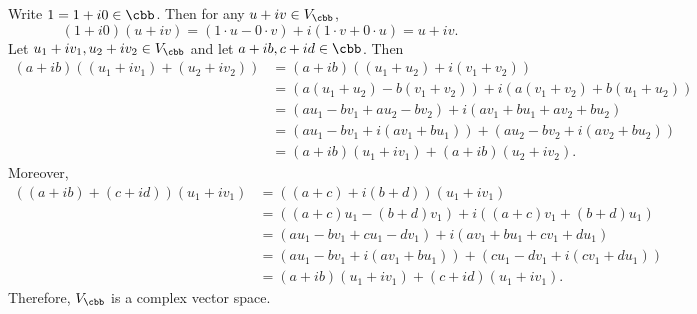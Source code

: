 \begin{sol}
     Write $1 = 1 + i0 \in \cbb$.
    Then for any $u + iv \in V_{\cbb}$,
    \[
        (1 + i0)(u + iv) = (1 \cdot u - 0 \cdot v) + i(1 \cdot v + 0 \cdot u) = u + iv.
    \]
     Let $u_1 + iv_1, u_2 + iv_2 \in V_{\cbb}$ and let $a + ib, c + id \in \cbb$.
    Then
    \begin{align*}
        (a + ib)((u_1 + iv_1) + (u_2 + iv_2)) &= (a + ib)((u_1 + u_2) + i(v_1 + v_2)) \\
        &= (a(u_1 + u_2) - b(v_1 + v_2)) + i(a(v_1 + v_2) + b(u_1 + u_2)) \\
        &= (au_1 - bv_1 + au_2 - bv_2) + i(av_1 + bu_1 + av_2 + bu_2) \\
        &= (au_1 - bv_1 + i(av_1 + bu_1)) + (au_2 - bv_2 + i(av_2 + bu_2)) \\
        &= (a + ib)(u_1 + iv_1) + (a + ib)(u_2 + iv_2).
    \end{align*}
    Moreover,
    \begin{align*}
        ((a + ib) + (c + id))(u_1 + iv_1) &= ((a + c) + i(b + d))(u_1 + iv_1) \\
        &= ((a + c)u_1 - (b + d)v_1) + i((a + c)v_1 + (b + d)u_1) \\
        &= (au_1 - bv_1 + cu_1 - dv_1) + i(av_1 + bu_1 + cv_1 + du_1) \\
        &= (au_1 - bv_1 + i(av_1 + bu_1)) + (cu_1 - dv_1 + i(cv_1 + du_1)) \\
        &= (a + ib)(u_1 + iv_1) + (c + id)(u_1 + iv_1).
    \end{align*}
    Therefore, $V_{\cbb}$ is a complex vector space.
\end{sol}